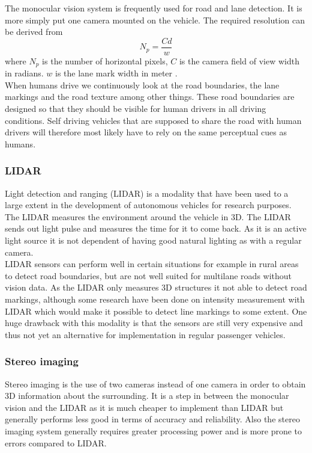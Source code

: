 The monocular vision system is frequently used for road and lane detection. It is more simply put one camera mounted on the vehicle. The required resolution can be derived from $$N_p = \frac{Cd}{w}$$where $N_p$ is the number of horizontal pixels, $C$ is the camera field of view width in radians. $w$ is the lane mark width in meter \cite{BarHillel2014}.\\

When humans drive we continuously look at the road boundaries, the lane markings and the road texture among other things. These road boundaries are designed so that they should be visible for human drivers in all driving conditions. Self driving vehicles that are supposed to share the road with human drivers will therefore most likely have to rely on the same perceptual cues as humans.

\subsubsection{LIDAR}
Light detection and ranging (LIDAR) is a modality that have been used to a large extent in the development of autonomous vehicles for research purposes. The LIDAR measures the environment around the vehicle in 3D. The LIDAR sends out light pulse and measures the time for it to come back. As it is an active light source it is not dependent of having good natural lighting as with a regular camera.\\

LIDAR sensors can perform well in certain situations for example in rural areas to detect road boundaries, \cite{BarHillel2014} but are not well suited for multilane roads without vision data. As the LIDAR only measures 3D structures it not able to detect road markings, although some research have been done on intensity measurement with LIDAR \cite{huang2009finding} \cite{kammel2008lidar} which would make it possible to detect line markings to some extent. One huge drawback with this modality is that the sensors are still very expensive and thus not yet an alternative for implementation in regular passenger vehicles.

\subsubsection{Stereo imaging}
Stereo imaging is the use of two cameras instead of one camera in order to obtain 3D information about the surrounding. It is a step in between the monocular vision and the LIDAR as it is much cheaper to implement than LIDAR but generally performs less good in terms of accuracy and reliability.  Also the stereo imaging system generally requires greater processing power and is more prone to errors compared to LIDAR. 


